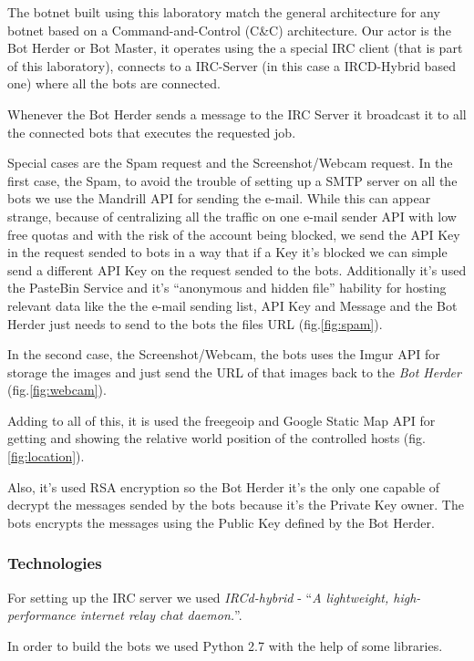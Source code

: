 \documentclass[]{article}
\begin{document}
The botnet built using this laboratory match the general architecture for any botnet based on a Command-and-Control (C\&C) architecture. Our actor is the Bot Herder or Bot Master, it operates using the a special IRC client (that is part of this laboratory), connects to a IRC-Server (in this case a IRCD-Hybrid based one) where all the bots are connected.

Whenever the Bot Herder sends a message to the IRC Server it broadcast it to all the connected bots that executes the requested job.

Special cases are the Spam request and the Screenshot/Webcam request. In the first case, the Spam, to avoid the trouble of setting up a SMTP server on all the bots we use the Mandrill API for sending the e-mail. While this can appear strange, because of centralizing all the traffic on one e-mail sender API with low free quotas and with the risk of the account being blocked, we send the API Key in the request sended to bots in a way that if a Key it’s blocked we can simple send a different API Key on the request sended to the bots. Additionally it’s used the PasteBin Service and it’s “anonymous and hidden file” hability for hosting relevant data like the the e-mail sending list, API Key and Message and the Bot Herder just needs to send to the bots the files URL (fig.\ref{fig:spam}).

In the second case, the Screenshot/Webcam, the bots uses the Imgur API for storage the images and just send the URL of that images back to the \textit{Bot Herder} (fig.\ref{fig:webcam}).

Adding to all of this, it is used the freegeoip and Google Static Map API for getting and showing the relative world position of the controlled hosts (fig.\ref{fig:location}).

Also, it’s used RSA encryption \cite{article:rsa} so the Bot Herder it’s the only one capable of decrypt the messages sended by the bots because it’s the Private Key owner. The bots encrypts the messages using the Public Key defined by the Bot Herder.

\subsubsection{Technologies}

For setting up the IRC server we used \textit{IRCd-hybrid} - “\textit{A lightweight, high-performance internet relay chat daemon.}”\cite{app:ircdhybrid}.

In order to build the bots we used Python 2.7 \cite{app:python} with the help of some libraries.
\end{document}
